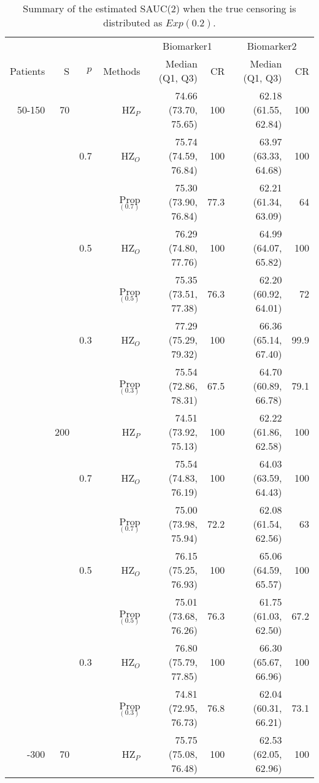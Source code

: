 \begin{table}[!htb]

\caption{\label{tab:tab2}Summary of the estimated SAUC(2) when the true censoring is distributed as $Exp(0.2)$.}
\centering
\begin{threeparttable}
\begin{tabular}[t]{rrrrrrrr}
\toprule
\multicolumn{1}{c}{} & \multicolumn{1}{c}{} & \multicolumn{1}{c}{} & \multicolumn{1}{c}{} & \multicolumn{2}{c}{Biomarker1} & \multicolumn{2}{c}{Biomarker2} \\
\cmidrule(l{3pt}r{3pt}){5-6} \cmidrule(l{3pt}r{3pt}){7-8}
Patients & S & $p$ & Methods & Median (Q1, Q3) & CR & Median (Q1, Q3) & CR\\
\midrule
50-150 & 70 &  & HZ$_P$ & 74.66 (73.70, 75.65) & 100 & 62.18 (61.55, 62.84) & 100\\
 &  & 0.7 & HZ$_O$ & 75.74 (74.59, 76.84) & 100 & 63.97 (63.33, 64.68) & 100\\
 &  &  & Prop$_{(0.7)}$ & 75.30 (73.90, 76.84) & 77.3 & 62.21 (61.34, 63.09) & 64\\
 &  & 0.5 & HZ$_O$ & 76.29 (74.80, 77.76) & 100 & 64.99 (64.07, 65.82) & 100\\
 &  &  & Prop$_{(0.5)}$ & 75.35 (73.51, 77.38) & 76.3 & 62.20 (60.92, 64.01) & 72\\
 &  & 0.3 & HZ$_O$ & 77.29 (75.29, 79.32) & 100 & 66.36 (65.14, 67.40) & 99.9\\
 &  &  & Prop$_{(0.3)}$ & 75.54 (72.86, 78.31) & 67.5 & 64.70 (60.89, 66.78) & 79.1\\
\addlinespace
 & 200 &  & HZ$_P$ & 74.51 (73.92, 75.13) & 100 & 62.22 (61.86, 62.58) & 100\\
 &  & 0.7 & HZ$_O$ & 75.54 (74.83, 76.19) & 100 & 64.03 (63.59, 64.43) & 100\\
 &  &  & Prop$_{(0.7)}$ & 75.00 (73.98, 75.94) & 72.2 & 62.08 (61.54, 62.56) & 63\\
 &  & 0.5 & HZ$_O$ & 76.15 (75.25, 76.93) & 100 & 65.06 (64.59, 65.57) & 100\\
 &  &  & Prop$_{(0.5)}$ & 75.01 (73.68, 76.26) & 76.3 & 61.75 (61.03, 62.50) & 67.2\\
 &  & 0.3 & HZ$_O$ & 76.80 (75.79, 77.85) & 100 & 66.30 (65.67, 66.96) & 100\\
 &  &  & Prop$_{(0.3)}$ & 74.81 (72.95, 76.73) & 76.8 & 62.04 (60.31, 66.21) & 73.1\\
\addlinespace
50-300 & 70 &  & HZ$_P$ & 75.75 (75.08, 76.48) & 100 & 62.53 (62.05, 62.96) & 100\\

\end{tabular}
\end{threeparttable}
\end{table}
